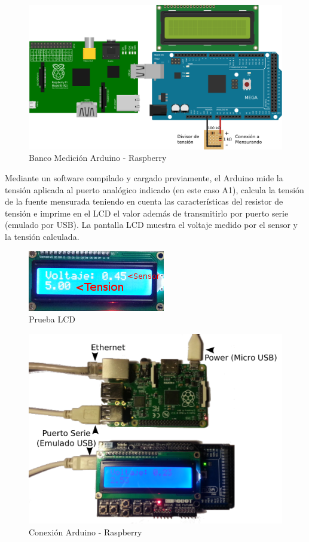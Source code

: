 \documentclass[12pt,a4paper]{article}
\begin{document}
		\begin{figure}[H]
			\centering
				\includegraphics[scale=0.8]{images/arduino1.pdf}\caption{Banco Medición Arduino - Raspberry}
			\end{figure}

		Mediante un software compilado y cargado previamente, el Arduino mide la tensión aplicada al puerto analógico indicado (en este caso A1), calcula la tensión de la fuente mensurada teniendo en cuenta las características del resistor de tensión e imprime en el LCD el valor además de transmitirlo por puerto serie (emulado por USB). La pantalla LCD muestra el voltaje medido por el sensor y la tensión calculada.

		\begin{figure}[H]
			\centering
				\includegraphics[scale=1.5]{images/ard1.png}\caption{Prueba LCD}
			\end{figure}

			\begin{figure}[H]
			\centering
				\includegraphics[scale=0.75]{images/arduino7.pdf}\caption{Conexión Arduino - Raspberry}
			\end{figure}
\end{document}

